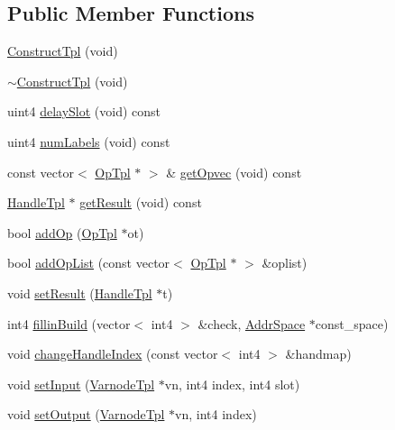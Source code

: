 \subsection*{Public Member Functions}
\begin{DoxyCompactItemize}
\item 
\mbox{\hyperlink{class_construct_tpl_ac48c40e9b9528d5116efd5a5ce4dd0a7}{Construct\+Tpl}} (void)
\item 
\mbox{\hyperlink{class_construct_tpl_ab0140ce80792d6d6a4544d9395ab3d9d}{$\sim$\+Construct\+Tpl}} (void)
\item 
uint4 \mbox{\hyperlink{class_construct_tpl_abf2e39342736d2c1d79c8f4bee68dc3a}{delay\+Slot}} (void) const
\item 
uint4 \mbox{\hyperlink{class_construct_tpl_aae30d682cb8171ae594cd9e031b39061}{num\+Labels}} (void) const
\item 
const vector$<$ \mbox{\hyperlink{class_op_tpl}{Op\+Tpl}} $\ast$ $>$ \& \mbox{\hyperlink{class_construct_tpl_acc7cf7bb955ba28c5e93c11e56fbd0ae}{get\+Opvec}} (void) const
\item 
\mbox{\hyperlink{class_handle_tpl}{Handle\+Tpl}} $\ast$ \mbox{\hyperlink{class_construct_tpl_a1d7e73bdea2a98c688276a87fc18f614}{get\+Result}} (void) const
\item 
bool \mbox{\hyperlink{class_construct_tpl_a7a29a748cbd83165ae89751a7f2b7814}{add\+Op}} (\mbox{\hyperlink{class_op_tpl}{Op\+Tpl}} $\ast$ot)
\item 
bool \mbox{\hyperlink{class_construct_tpl_a1744c9bd849faf17b5a68519fcaa58eb}{add\+Op\+List}} (const vector$<$ \mbox{\hyperlink{class_op_tpl}{Op\+Tpl}} $\ast$ $>$ \&oplist)
\item 
void \mbox{\hyperlink{class_construct_tpl_af07c1652b17290409b235a235001424f}{set\+Result}} (\mbox{\hyperlink{class_handle_tpl}{Handle\+Tpl}} $\ast$t)
\item 
int4 \mbox{\hyperlink{class_construct_tpl_a917003d51923a5e694cc489ed5b96c06}{fillin\+Build}} (vector$<$ int4 $>$ \&check, \mbox{\hyperlink{class_addr_space}{Addr\+Space}} $\ast$const\+\_\+space)
\item 
void \mbox{\hyperlink{class_construct_tpl_a6748ce8632e758aabf9b0d5a252fad5f}{change\+Handle\+Index}} (const vector$<$ int4 $>$ \&handmap)
\item 
void \mbox{\hyperlink{class_construct_tpl_a081103bb58d0e252b4b5b482c49113c6}{set\+Input}} (\mbox{\hyperlink{class_varnode_tpl}{Varnode\+Tpl}} $\ast$vn, int4 index, int4 slot)
\item 
void \mbox{\hyperlink{class_construct_tpl_a7c917fe6ab8eea662f8d2c8818f11104}{set\+Output}} (\mbox{\hyperlink{class_varnode_tpl}{Varnode\+Tpl}} $\ast$vn, int4 index)

\end{DoxyCompactItemize}
